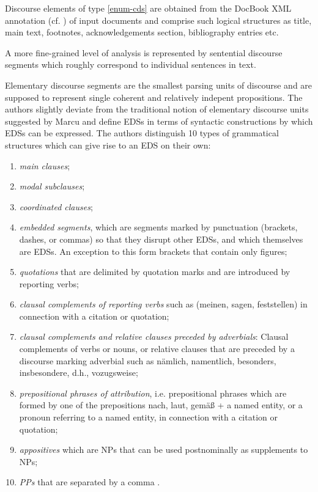 \documentclass[a4paper,11pt]{article}
\begin{document}
Discourse elements of type \ref{enum-cds} are obtained from the DocBook XML
annotation (cf. \cite{Walsh-99}) of input documents and comprise such logical
structures as title, main text, footnotes, acknowledgements section,
bibliography entries etc.

A more fine-grained level of analysis is represented by sentential discourse
segments which roughly correspond to individual sentences in text.

Elementary discourse segments are the smallest parsing units of discourse and
are supposed to represent single coherent and relatively indepent
propositions.  The authors slightly deviate from the traditional notion of
elementary discourse units suggested by Marcu \cite{Marcu-99} and define EDSs
in terms of syntactic constructions by which EDSs can be expressed.  The
authors distinguish 10 types of grammatical structures which can give rise to
an EDS on their own:
\begin{enumerate}
  \item \textit{main clauses};
  \item \textit{modal subclauses};
  \item \textit{coordinated clauses};
  \item \textit{embedded segments}, which are segments marked by punctuation
    (brackets, dashes, or commas) so that they disrupt other EDSs, and which
    themselves are EDSs. An exception to this form brackets that contain only
    figures;
  \item \textit{quotations} that are delimited by quotation marks and are
    introduced by reporting verbs;
  \item \textit{clausal complements of reporting verbs} such as (meinen,
    sagen, feststellen) in connection with a citation or quotation;
  \item \textit{clausal complements and relative clauses preceded by
    adverbials}: Clausal complements of verbs or nouns, or relative clauses
    that are preceded by a discourse marking adverbial such as n\"amlich,
    namentlich, besonders, insbesondere, d.h., vozugsweise;
  \item \textit{prepositional phrases of attribution}, i.e. prepositional
    phrases which are formed by one of the prepositions nach, laut, gem\"a\ss
    + a named entity, or a pronoun referring to a named entity, in connection
    with a citation or quotation;
  \item \textit{appositives} which are NPs that can be used postnominally as
    supplements to NPs;
  \item \textit{PPs} that are separated by a comma .
\end{enumerate}
\end{document}
